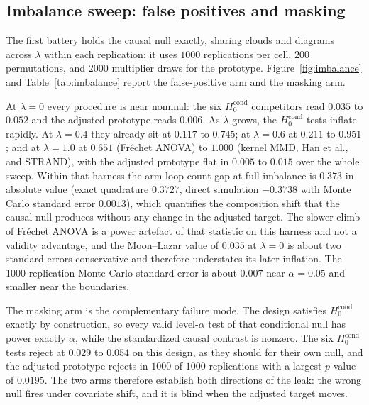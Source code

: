 \subsection{Imbalance sweep: false positives and masking}
\label{sec:exp:imbalance}

The first battery holds the causal null exactly, sharing clouds and diagrams across $\lambda$ within each replication; it uses $1000$ replications per cell, $200$ permutations, and $2000$ multiplier draws for the prototype. Figure~\ref{fig:imbalance} and Table~\ref{tab:imbalance} report the false-positive arm and the masking arm.

At $\lambda=0$ every procedure is near nominal: the six $H_0^{\mathrm{cond}}$ competitors read $0.035$ to $0.052$ and the adjusted prototype reads $0.006$. As $\lambda$ grows, the $H_0^{\mathrm{cond}}$ tests inflate rapidly. At $\lambda=0.4$ they already sit at $0.117$ to $0.745$; at $\lambda=0.6$ at $0.211$ to $0.951$; and at $\lambda=1.0$ at $0.651$ (Fr\'echet ANOVA) to $1.000$ (kernel MMD, Han et al., and STRAND), with the adjusted prototype flat in $0.005$ to $0.015$ over the whole sweep. Within that harness the arm loop-count gap at full imbalance is $0.373$ in absolute value (exact quadrature $0.3727$, direct simulation $-0.3738$ with Monte Carlo standard error $0.0013$), which quantifies the composition shift that the causal null produces without any change in the adjusted target. The slower climb of Fr\'echet ANOVA is a power artefact of that statistic on this harness and not a validity advantage, and the Moon--Lazar value of $0.035$ at $\lambda=0$ is about two standard errors conservative and therefore understates its later inflation. The 1000-replication Monte Carlo standard error is about $0.007$ near $\alpha=0.05$ and smaller near the boundaries.

The masking arm is the complementary failure mode. The design satisfies $H_0^{\mathrm{cond}}$ exactly by construction, so every valid level-$\alpha$ test of that conditional null has power exactly $\alpha$, while the standardized causal contrast is nonzero. The six $H_0^{\mathrm{cond}}$ tests reject at $0.029$ to $0.054$ on this design, as they should for their own null, and the adjusted prototype rejects in $1000$ of $1000$ replications with a largest $p$-value of $0.0195$. The two arms therefore establish both directions of the leak: the wrong null fires under covariate shift, and it is blind when the adjusted target moves.

